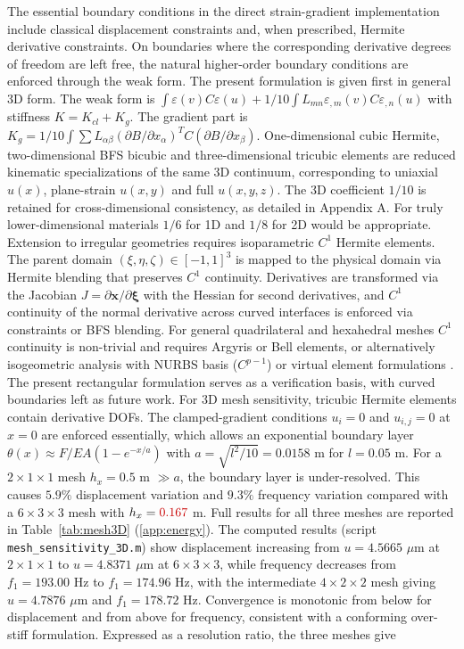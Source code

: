 \documentclass[final,3p,times,fleqn]{elsarticle}
\newcommand{\revtwo}[1]{\textcolor{revtwocolor}{#1}}
\begin{document}
The essential boundary conditions in the direct strain-gradient
implementation include classical displacement constraints and, when
prescribed, Hermite derivative constraints. On boundaries where the
corresponding derivative degrees of freedom are left free, the natural
higher-order boundary conditions are enforced through the weak form.
The present formulation is given first in general 3D form. The weak form is $\int\varepsilon(v)C\varepsilon(u)+1/10\int L_{mn}\varepsilon_{,m}(v)C\varepsilon_{,n}(u)$ with stiffness $K=K_{cl}+K_g$. The gradient part is $K_g=1/10\int\sum L_{\alpha\beta}(\partial B/\partial x_\alpha)^T C (\partial B/\partial x_\beta)$. One-dimensional cubic Hermite, two-dimensional BFS bicubic and three-dimensional tricubic elements are reduced kinematic specializations of the same 3D continuum, corresponding to uniaxial $u(x)$, plane-strain $u(x,y)$ and full $u(x,y,z)$. The 3D coefficient $1/10$ is retained for cross-dimensional consistency, as detailed in Appendix A. For truly lower-dimensional materials $1/6$ for 1D and $1/8$ for 2D would be appropriate. Extension to irregular geometries requires isoparametric $C^1$ Hermite elements. The parent domain $(\xi,\eta,\zeta)\in[-1,1]^3$ is mapped to the physical domain via Hermite blending that preserves $C^1$ continuity. Derivatives are transformed via the Jacobian $J=\partial\mathbf{x}/\partial\boldsymbol{\xi}$ with the Hessian for second derivatives, and $C^1$ continuity of the normal derivative across curved interfaces is enforced via constraints or BFS blending. For general quadrilateral and hexahedral meshes $C^1$ continuity is non-trivial and requires Argyris or Bell elements, or alternatively isogeometric analysis with NURBS basis ($C^{p-1}$) or virtual element formulations \cite{WriggersHudobivnik2023}. The present rectangular formulation serves as a verification basis, with curved boundaries left as future work. For 3D mesh sensitivity, tricubic Hermite elements contain derivative DOFs. The clamped-gradient conditions $u_i=0$ and $u_{i,j}=0$ at $x=0$ are enforced essentially, which allows an exponential boundary layer $\theta(x)\approx F/EA(1-e^{-x/a})$ with $a=\sqrt{l^2/10}=0.0158$ m for $l=0.05$ m. For a $2\times1\times1$ mesh $h_x=0.5$ m $\gg a$, the boundary layer is under-resolved. This causes $5.9\%$ displacement variation and $9.3\%$ frequency variation compared with a $6\times3\times3$ mesh with $h_x=\revtwo{0.167}$ m. \revtwo{Full results for all three meshes are reported in
Table~\ref{tab:mesh3D} (\ref{app:energy}). }\revtwo{The computed results (script \texttt{mesh\_sensitivity\_3D.m}) show displacement} increasing from $u=4.5665$ $\mu$m at $2\times1\times1$ to $u=4.8371$ $\mu$m at $6\times3\times3$, while frequency decreases from $f_1=193.00$ Hz to $f_1=174.96$ Hz, with the intermediate $4\times2\times2$ mesh giving $u=4.7876$ $\mu$m and $f_1=178.72$ Hz. Convergence is monotonic from below for displacement and from above for frequency, consistent with a conforming over-stiff formulation. \revtwo{Expressed as a resolution ratio, the three meshes give
}
\end{document}
